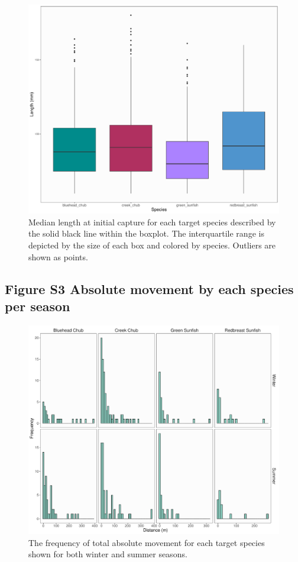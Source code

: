 \documentclass[11pt, class=article, crop=false]{standalone}
\begin{document}
\begin{figure}
    \centering
    \includegraphics[width=0.9\linewidth]{output/fig_size_dist.pdf}
    \caption{Median length at initial capture for each target species described by the solid black line within the boxplot. The interquartile range is depicted by the size of each box and colored by species. Outliers are shown as points.}
    \label{fig:fig_size_dist}
\end{figure}

\newpage

\subsection{Figure S3 Absolute movement by each species per season}

\begin{figure}
    \centering
    \includegraphics[width=0.9\linewidth]{output/fig_total_move.pdf}
    \caption{The frequency of total absolute movement for each target species shown for both winter and summer seasons.}
    \label{fig:fig_total_move}
\end{figure}
\end{document}
